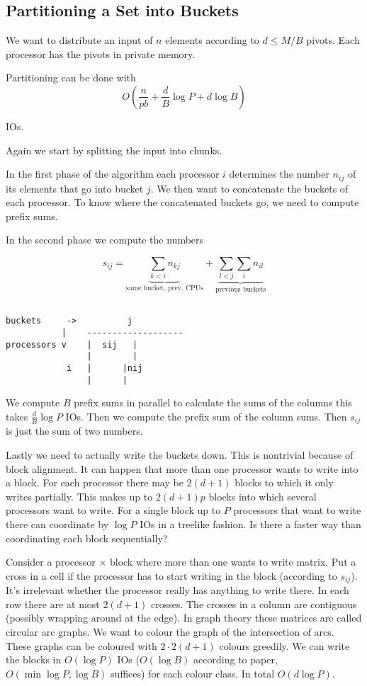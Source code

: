 \subsection{Partitioning a Set into Buckets}

We want to distribute an input of $n$ elements according to $d\leq M/B$ pivots. Each processor has the pivots in private memory.

\begin{thm} Partitioning can be done with
\[O(\frac{n}{pb} + \frac{d}{B}\log P + d\log B)\]

IOs.
\end{thm}

Again we start by splitting the input into chunks.

In the first phase of the algorithm each processor $i$ determines the number $n_{ij}$ of its elements that go into bucket $j$. We then want to concatenate the buckets of each processor. To know where the concatenated buckets go, we need to compute prefix sums.

In the second phase we compute the numbers 

\[s_{ij} = \underbrace{\sum_{k<i} n_{kj}}_{\text{same bucket, prev. CPUs}} + \underbrace{\sum_{l<j}\sum_i n_{il}}_{\text{previous buckets}}\] 

\begin{verbatim}

buckets     ->          j
           |    -------------------
processors v    |  sij   |  
                |        |
            i   |      |nij
                |      |
\end{verbatim}

We compute $B$ prefix sums in parallel to calculate the sums of the columns this takes $\frac dB \log P$ IOs. Then we compute the prefix sum of the column sums. Then $s_{ij}$ is just the sum of two numbers.

Lastly we need to actually write the buckets down. This is nontrivial because of block alignment. It can happen that more than one processor wants to write into a block. For each processor there may be $2(d+1)$ blocks to which it only writes partially. This makes up to $2(d+1)p$ blocks into which several processors want to write. For a single block up to $P$ processors that want to write there can coordinate by $\log P$ IOs in a treelike fashion. Is there a faster way than coordinating each block sequentially?

Consider a processor $\times $ block where more than one wants to write matrix. Put a cross in a cell if the processor has to start writing in the block (according to $s_{ij}$). It's irrelevant whether the processor really has anything to write there. In each row there are at most $2(d+1)$ crosses. The crosses in a column are contiguous (possibly wrapping around at the edge). In graph theory these matrices are called circular arc graphs. We want to colour the graph of the intersection of arcs. These graphs can be coloured with $2\cdot 2(d+1)$ colours greedily. We can write the blocks in $O(\log P)$ IOs ($O(\log B)$ according to paper, $O(\min \log P, \log B)$ suffices) for each colour class. In total $O(d\log P)$.

